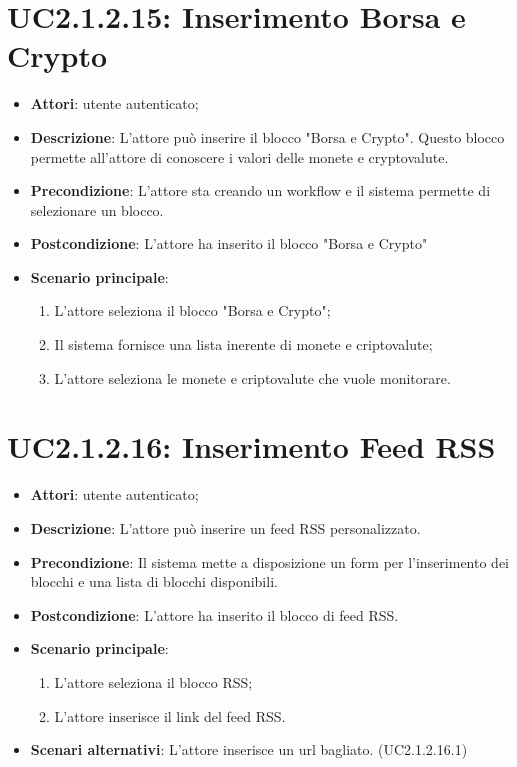 \section{UC2.1.2.15: Inserimento Borsa e Crypto}
\label{UC2.1.2.15}
\begin{itemize}
	\item \textbf{Attori}: utente autenticato;
	\item \textbf{Descrizione}: L'attore può inserire il blocco "Borsa e Crypto". Questo blocco permette all'attore di conoscere i valori delle monete e cryptovalute. 
	\item \textbf{Precondizione}: L'attore sta creando un workflow e il sistema permette di selezionare un blocco.
	\item \textbf{Postcondizione}: L'attore ha inserito il blocco "Borsa e Crypto"
	\item \textbf{Scenario principale}:
	\begin{enumerate} \item L'attore seleziona il blocco "Borsa e Crypto";  \item  Il sistema fornisce una lista inerente di monete e criptovalute;  \item  L'attore seleziona le monete e criptovalute che vuole monitorare.\end{enumerate}
\end{itemize}

\section{UC2.1.2.16: Inserimento Feed RSS}
\label{UC2.1.2.16}
\begin{itemize}
	\item \textbf{Attori}: utente autenticato;
	\item \textbf{Descrizione}: L'attore può inserire un feed RSS personalizzato.
	\item \textbf{Precondizione}: Il sistema mette a disposizione un form per l'inserimento dei blocchi e una lista di blocchi disponibili.
	\item \textbf{Postcondizione}: L'attore ha inserito il blocco di feed RSS.
	\item \textbf{Scenario principale}:
	\begin{enumerate} \item L'attore seleziona il blocco RSS;  \item  L'attore inserisce il link del feed RSS.\end{enumerate}
	\item \textbf{Scenari alternativi}:
	L'attore inserisce un url bagliato. (UC2.1.2.16.1)
\end{itemize}

